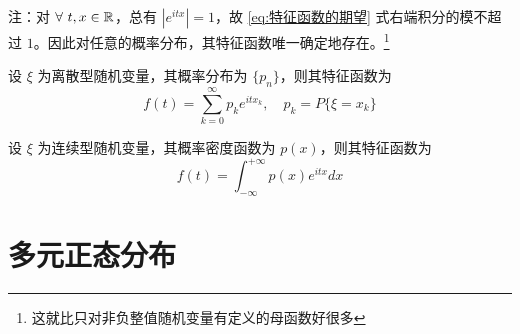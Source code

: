 \documentclass[12pt,a4paper]{amsart}
\begin{document}
注：对 $\forall ~ t,x\in \mathbb{R}$，总有 $|e^{itx}| = 1$，故 \ref{eq:特征函数的期望} 式右端积分的模不超过 $1$。因此对任意的概率分布，其特征函数唯一确定地存在。\footnote{这就比只对非负整值随机变量有定义的母函数好很多}

\begin{definition}[离散型随机变量的特征函数]
    设 $\xi$ 为离散型随机变量，其概率分布为 $\{p_n\}$，则其特征函数为
    \begin{equation}
        f(t) = \sum_{k=0}^{\infty} p_k e^{itx_k},\quad p_k = P\{\xi = x_k\}
    \end{equation}
\end{definition}

\begin{definition}[连续型随机变量的特征函数]
    设 $\xi$ 为连续型随机变量，其概率密度函数为 $p(x)$，则其特征函数为
    \begin{equation}
        f(t) = \int_{-\infty}^{+\infty} p(x) e^{itx} dx
    \end{equation}
\end{definition}

\section{多元正态分布}

\appendix


{\footnotesize}
\end{document}
